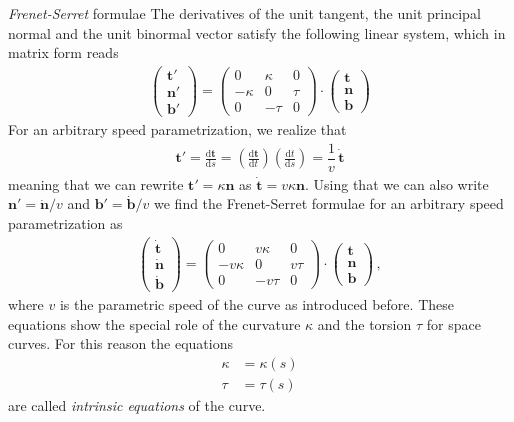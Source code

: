 \documentclass[11pt, DINA4, fleqn]{amsart}
\def\df{\mathrm{d}\xspace}
\newcommand{\dd}[2]{\frac{\df#1}{\df#2}}
\def\vt{\boldsymbol{t}\xspace}
\def\vn{\boldsymbol{n}\xspace}
\def\vb{\boldsymbol{b}\xspace}
\begin{document}
\begin{mybox_tc3}{\emph{Frenet-Serret} formulae}
	The derivatives of the unit tangent, the unit principal normal and the unit binormal vector satisfy the following linear system, which in matrix form reads
\begin{align}
\begin{pmatrix}
\vt' \\ \vn' \\ \vb'
\end{pmatrix} = 
\begin{pmatrix}
0 & \kappa & 0\\
-\kappa & 0 & \tau \\
0 & - \tau & 0 
\end{pmatrix} 
\cdot
\begin{pmatrix}
\vt \\ \vn \\ \vb
\end{pmatrix} 
\end{align}
For an arbitrary speed parametrization, we realize that
\begin{align}
\vt' = \dd{\vt}{s} = \left(\dd{\vt}{t}\right) \left(\dd{t}{s}\right) = \dfrac{1}{v} \, \dot{\vt}
\end{align}
meaning that we can rewrite $\vt' = \kappa \vn$ as
$\dot{\vt} = v\kappa \vn$. Using that we can also write $\vn' = \dot{\vn}/v$ and $\vb' = \dot{\vb}/v$ we find the Frenet-Serret formulae for an arbitrary speed parametrization as
\begin{align}
\begin{pmatrix}
\dot{\vt} \\ \dot{\vn} \\ \dot{\vb}
\end{pmatrix} = 
\begin{pmatrix}
0 & v\kappa & 0\\
-v\kappa & 0 & v\tau \\
0 & - v\tau & 0 
\end{pmatrix} 
\cdot
\begin{pmatrix}
\vt \\ \vn \\ \vb
\end{pmatrix}  \, ,
\end{align}
where $v$ is the parametric speed of the curve as introduced before.
These equations show the special role of the curvature $\kappa$ and the torsion $\tau$ for space curves. For this reason the equations
\begin{align}
\kappa &= \kappa(s) \\
\tau &= \tau(s)
\end{align}
are called \emph{intrinsic equations} of the curve.
\end{mybox_tc3}
\end{document}
